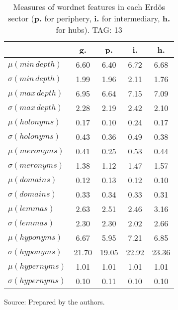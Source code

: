 \begin{table}[h!]
\begin{center}
	\caption{Measures of wordnet features in each Erd\"os sector ({{\bf p.}} for periphery, {{\bf i.}} for intermediary, {{\bf h.}} for hubs). TAG: 13}\label{tab:wnn}
\begin{tabular}{| l || c | c | c | c |}\hline
 & {\bf g.} & {\bf p.} & {\bf i.} & {\bf h.} \\\hline\hline
$\mu(min\,depth)$ & 6.60  & 6.40  & 6.72  & 6.68 \\
$\sigma(min\,depth)$ & 1.99  & 1.96  & 2.11  & 1.76 \\\hline
$\mu(max\,depth)$ & 6.95  & 6.64  & 7.15  & 7.09 \\
$\sigma(max\,depth)$ & 2.28  & 2.19  & 2.42  & 2.10 \\\hline
$\mu(holonyms)$ & 0.17  & 0.10  & 0.24  & 0.17 \\
$\sigma(holonyms)$ & 0.43  & 0.36  & 0.49  & 0.38 \\\hline
$\mu(meronyms)$ & 0.41  & 0.25  & 0.53  & 0.44 \\
$\sigma(meronyms)$ & 1.38  & 1.12  & 1.47  & 1.57 \\\hline
$\mu(domains)$ & 0.12  & 0.13  & 0.12  & 0.10 \\
$\sigma(domains)$ & 0.33  & 0.34  & 0.33  & 0.31 \\\hline
$\mu(lemmas)$ & 2.63  & 2.51  & 2.46  & 3.16 \\
$\sigma(lemmas)$ & 2.30  & 2.30  & 2.02  & 2.66 \\\hline
$\mu(hyponyms)$ & 6.67  & 5.95  & 7.21  & 6.85 \\
$\sigma(hyponyms)$ & 21.70  & 19.05  & 22.92  & 23.36 \\\hline
$\mu(hypernyms)$ & 1.01  & 1.01  & 1.01  & 1.01 \\
$\sigma(hypernyms)$ & 0.10  & 0.11  & 0.10  & 0.10 \\\hline
\end{tabular}
\begin{flushleft}
		Source: Prepared by the authors.\
\end{flushleft}
\end{center}
\end{table}
